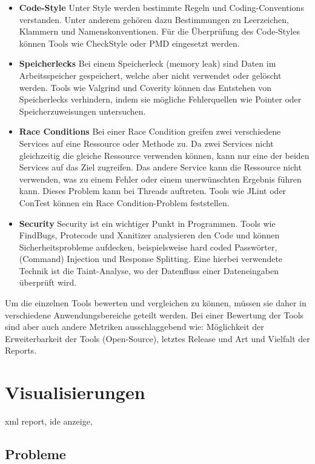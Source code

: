 \begin{itemize}
\item \textbf{Code-Style} Unter Style werden bestimmte Regeln und Coding-Conventions verstanden. Unter anderem gehören dazu Bestimmungen zu Leerzeichen, Klammern und Namenskonventionen. Für die Überprüfung des Code-Styles können Tools wie CheckStyle oder PMD eingesetzt werden.
\item \textbf{Speicherlecks}
Bei einem Speicherleck (memory leak) sind Daten im Arbeitsspeicher gespeichert,  welche aber nicht verwendet oder gelöscht werden. Tools wie Valgrind und Coverity können das Entstehen von Speicherlecks verhindern, indem sie mögliche Fehlerquellen wie Pointer oder Speicherzuweisungen untersuchen.
\item \textbf{Race Conditions}
Bei einer Race Condition greifen zwei verschiedene Services auf eine Ressource oder Methode zu. Da zwei Services nicht gleichzeitig die  gleiche Ressource verwenden können, kann nur eine der beiden Services auf das Ziel zugreifen. Das andere Service kann die Ressource nicht verwenden, was zu einem Fehler oder einem unerwünschten Ergebnis führen kann. Dieses Problem kann bei Threads auftreten. Tools wie JLint oder ConTest können ein Race Condition-Problem feststellen.
\item \textbf{Security}
Security ist ein wichtiger Punkt in Programmen. Tools wie FindBugs, Protecode und Xanitizer analysieren den Code und können Sicherheitsprobleme aufdecken, beispielsweise hard coded Passwörter, (Command) Injection und Response Splitting. \cite{goseva2015capability} Eine hierbei verwendete Technik ist die Taint-Analyse, wo der Datenfluss einer Dateneingaben überprüft wird. \cite{jung2014sensitive}
\end{itemize}

Um die einzelnen Tools bewerten und vergleichen zu können, müssen sie daher in verschiedene Anwendungsbereiche geteilt werden. Bei einer Bewertung der Tools sind aber auch andere Metriken ausschlaggebend wie: Möglichkeit der Erweiterbarkeit der Tools (Open-Source), letztes Release und Art und Vielfalt der Reports. ~\parencite{comparativeAnalysisTools}

\section{Visualisierungen} 
xml report, ide anzeige, 
\subsection{Probleme} 


